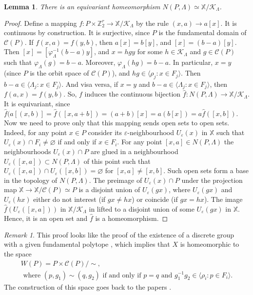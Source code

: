 \documentclass[12pt]{amsart}
\newtheorem{lemma}[formula]{Lemma}
\theoremstyle{definition}
\theoremstyle{remark}
\newtheorem{remark}[formula]{Remark}
\begin{document}
\begin{lemma}\label{lemLKNP}
There is an equivariant homeomorphism $N(P,\Lambda)\simeq\mathbb X/\mathcal{K}_{\Lambda}$.
\end{lemma}
\begin{proof}

Define a mapping $f\colon P\times\mathbb Z_2^r\to \mathbb X/\mathcal{K}_{\Lambda}$ by the 
rule $(x,a)\to a[x]$. It is continuous by construction. It is surjective, since $P$ is the fundamental domain of $\mathcal{C}(P)$.
If $f(x,a)=f(y,b)$, then $a[x]=b[y]$, and $[x]=(b-a)[y]$. Then $[x]=\left[\varphi_\Lambda^{-1}(b-a)y\right]$,
and $x=hgy$ for some $h\in \mathcal{K}_{\Lambda}$ and $g\in\mathcal{C}(P)$ such that
$\varphi_\Lambda(g)=b-a$. Moreover, $\varphi_\Lambda(hg)=b-a$.
In particular, $x=y$ (since $P$ is the orbit space of $\mathcal{C}(P)$), and $hg\in \langle \rho_j\colon x\in F_j\rangle$. 
Then $b-a\in\langle\Lambda_j\colon x\in F_j\rangle$. And visa versa, if $x=y$ and $b-a\in\langle\Lambda_j\colon x\in F_j\rangle$, then $f(a,x)=f(y,b)$. So, $f$ induces the continuous bijection 
$\widehat{f}\colon N(P,\Lambda)\to \mathbb X/\mathcal{K}_{\Lambda}$. It is equivariant, since
$\widehat{f}(a[(x,b)]=\widehat{f}([x,a+b])=(a+b)[x]=a(b[x])=a\widehat{f}([x,b])$. Now we need to prove only that
this mapping sends open sets to open sets. Indeed, for any point $x\in P$ consider its $\varepsilon$-neighbourhood $U_{\varepsilon}(x)$ in $\mathbb X$ such that $U_{\varepsilon}(x)\cap F_i\ne\varnothing$ if and only if $x\in F_i$.
For any point $[x,a]\in N(P,\Lambda)$ the neighbourhoods $U_{\varepsilon}(x)\cap P$ 
are glued in a neighbourhood $U_{\varepsilon}([x,a])\subset  N(P,\Lambda)$ of this point such that 
$U_{\varepsilon}([x,a])\cap U_{\varepsilon}([x,b])=\varnothing$ for  $[x,a]\ne [x,b]$. Such open sets form 
a base in the topology of $N(P,\Lambda)$. The preimage of $U_{\varepsilon}(x)\cap P$ under the projection map
$\mathbb X\to \mathbb X/\mathcal{C}(P)\simeq P$ is a disjoint union of  $U_{\varepsilon}(gx)$,
where $U_{\varepsilon}(gx)$ and $U_{\varepsilon}(hx)$ either do not interest (if $gx\ne hx$) or coincide (if $gx=hx$).
The image $\widehat{f}(U_{\varepsilon}([x,a]))$ in $\mathbb X/\mathcal{K}_{\Lambda}$ in lifted to a disjoint union of some 
$U_{\varepsilon}(gx)$ in $\mathbb X$. Hence, it is an open set and $\widehat{f}$ is a homeomorphism.
\end{proof}
\begin{remark}
This proof looks like the proof of the existence of a discrete group with a given fundamental polytope \cite[Theorem 1.8]{VS88},
which implies that $X$ is homeomorphic to the space 
\begin{gather*}
W(P)=P\times \mathcal{C}(P)/\sim,\\
\text{ where }(p,g_1)\sim(q,g_2)\text{ if and only if }p=q \text{ and }g_1^{-1}g_2\in
\langle \rho_i\colon p\in F_i\rangle.
 \end{gather*}
The construction of this space goes back to the papers \cite{V71, D83}.
\end{remark}
\end{document}
